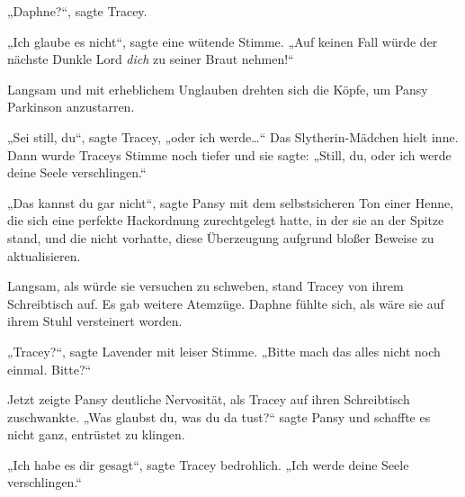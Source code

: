 „Daphne?“, sagte Tracey.

„Ich glaube es nicht“, sagte eine wütende Stimme. „Auf keinen Fall würde der nächste Dunkle Lord \emph{dich} zu seiner Braut nehmen!“

Langsam und mit erheblichem Unglauben drehten sich die Köpfe, um Pansy Parkinson anzustarren.

„Sei still, du“, sagte Tracey, „oder ich werde…“ Das Slytherin-Mädchen hielt inne. Dann wurde Traceys Stimme noch tiefer und sie sagte: „Still, du, oder ich werde deine Seele verschlingen.“

„Das kannst du gar nicht“, sagte Pansy mit dem selbstsicheren Ton einer Henne, die sich eine perfekte Hackordnung zurechtgelegt hatte, in der sie an der Spitze stand, und die nicht vorhatte, diese Überzeugung aufgrund bloßer Beweise zu aktualisieren.

Langsam, als würde sie versuchen zu schweben, stand Tracey von ihrem Schreibtisch auf. Es gab weitere Atemzüge. Daphne fühlte sich, als wäre sie auf ihrem Stuhl versteinert worden.

„Tracey?“, sagte Lavender mit leiser Stimme. „Bitte mach das alles nicht noch einmal. Bitte?“

Jetzt zeigte Pansy deutliche Nervosität, als Tracey auf ihren Schreibtisch zuschwankte. „Was glaubst du, was du da tust?“ sagte Pansy und schaffte es nicht ganz, entrüstet zu klingen.

„Ich habe es dir gesagt“, sagte Tracey bedrohlich. „Ich werde deine Seele verschlingen.“

